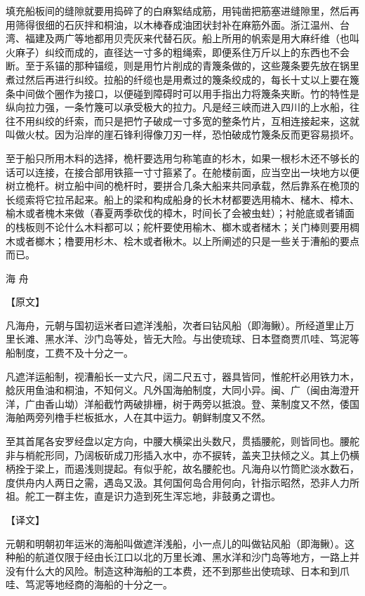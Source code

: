 \documentclass[12pt,UTF8]{ctexbook}
\begin{document}
填充船板间的缝隙就要用捣碎了的白麻絮结成筋，用钝凿把筋塞进缝隙里，然后再用筛得很细的石灰拌和桐油，以木棒舂成油团状封补在麻筋外面。浙江温州、台湾、福建及两广等地都用贝壳灰来代替石灰。船上所用的帆索是用大麻纤维（也叫火麻子）纠绞而成的，直径达一寸多的粗绳索，即便系住万斤以上的东西也不会断。至于系锚的那种锚缆，则是用竹片削成的青篾条做的，这些蔑条要先放在锅里煮过然后再进行纠绞。拉船的纤缆也是用煮过的篾条绞成的，每长十丈以上要在篾条中间做个圈作为接口，以便碰到障碍时可以用手指出力将篾条夹断。竹的特性是纵向拉力强，一条竹篾可以承受极大的拉力。凡是经三峡而进入四川的上水船，往往不用纠绞的纤索，而只是把竹子破成一寸多宽的整条竹片，互相连接起来，这就叫做火杖。因为沿岸的崖石锋利得像刀刃一样，恐怕破成竹篾条反而更容易损坏。

至于船只所用木料的选择，桅杆要选用匀称笔直的杉木，如果一根杉木还不够长的话可以连接，在接合部用铁箍一寸寸箍紧了。在舱楼前面，应当空出一块地方以便树立桅杆。树立船中间的桅杆时，要拼合几条大船来共同承载，然后靠系在桅顶的长缆索将它拉吊起来。船上的梁和构成船身的长木材都要选用楠木、槠木、樟木、榆木或者槐木来做（春夏两季砍伐的樟木，时间长了会被虫蛀）；衬舱底或者铺面的栈板则不论什么木料都可以；舵杆要使用榆木、榔木或者槠木；关门棒则要用椆木或者榔木；橹要用杉木、桧木或者楸木。以上所阐述的只是一些关于漕船的要点而已。

海 舟

【原文】

凡海舟，元朝与国初运米者曰遮洋浅船，次者曰钻风船（即海鳅）。所经道里止万里长滩、黑水洋、沙门岛等处，皆无大险。与出使琉球、日本暨商贾爪哇、笃泥等船制度，工费不及十分之一。

凡遮洋运船制，视漕船长一丈六尺，阔二尺五寸，器具皆同，惟舵杆必用铁力木，艌灰用鱼油和桐油，不知何义。凡外国海舶制度，大同小异。闽、广（闽由海澄开洋，广由香山坳）洋船截竹两破排栅，树于两旁以抵浪。登、莱制度又不然，倭国海舶两旁列橹手栏板抵水，人在其中运力。朝鲜制度又不然。

至其首尾各安罗经盘以定方向，中腰大横梁出头数尺，贯插腰舵，则皆同也。腰舵非与梢舵形同，乃阔板斫成刀形插入水中，亦不捩转，盖夹卫扶倾之义。其上仍横柄拴于梁上，而遏浅则提起。有似乎舵，故名腰舵也。凡海舟以竹筒贮淡水数石，度供舟内人两日之需，遇岛又汲。其何国何岛合用何向，针指示昭然，恐非人力所祖。舵工一群主佐，直是识力造到死生浑忘地，非鼓勇之谓也。

【译文】

元朝和明朝初年运米的海船叫做遮洋浅船，小一点儿的叫做钻风船（即海鳅）。这种船的航道仅限于经由长江口以北的万里长滩、黑水洋和沙门岛等地方，一路上并没有什么大的风险。制造这种海船的工本费，还不到那些出使琉球、日本和到爪哇、笃泥等地经商的海船的十分之一。
\end{document}
